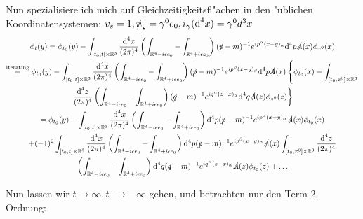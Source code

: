 \documentclass[a4paper,12pt]{article}
\newcommand{\equaltext}[1]{\ensuremath{\stackrel{\text{#1}}{=}}}
\begin{document}
Nun spezialisiere ich mich auf Gleichzeitigkeitsfl"achen in den "ublichen Koordinatensystemen: \(v_s=1,\slashed{n}_s=\gamma^0 e_0, i_\gamma(\text{d}^4 x)=\gamma^0 d^3x\)
\begin{multline}
\phi_t(y)=\phi_{t_0}(y)
- \int_{[t_0,t]\times \mathbb{R}^3} \frac{\text{d}^4x}{(2\pi)^4} \left( \int_{\mathbb{R}^4-i \epsilon e_0}-\int_{\mathbb{R}^4+i \epsilon e_0} \right) (\slashed{p}-m)^{-1} e^{ip^\alpha (x-y)_\alpha}  \text{d}^4p \slashed{A}(x)\phi_{x^0}(x)\\
\equaltext{iterating}\phi_{t_0}(y)- \int_{[t_0,t]\times \mathbb{R}^3} \frac{\text{d}^4x}{(2\pi)^4} \left( \int_{\mathbb{R}^4-i \epsilon e_0}-\int_{\mathbb{R}^4+i \epsilon e_0} \right) (\slashed{p}-m)^{-1} e^{ip^\beta(x-y)_\beta}  \text{d}^4p \slashed{A}(x)\left\{\phi_{t_0}(x)- \int_{[t_0,x^0]\times \mathbb{R}^3} \right.\\ 
\left. \frac{\text{d}^4z}{(2\pi)^4} \left( \int_{\mathbb{R}^4-i \epsilon e_0}-\int_{\mathbb{R}^4+i \epsilon e_0} \right) (\slashed{q}-m)^{-1} e^{iq^\alpha(z-x)_\alpha}  \text{d}^4q \slashed{A}(z)\phi_{z^0}(z)\right\}\\
=\phi_{t_0}(y)- \int_{[t_0,t]\times \mathbb{R}^3} \frac{\text{d}^4x}{(2\pi)^4} \left( \int_{\mathbb{R}^4-i \epsilon e_0}-\int_{\mathbb{R}^4+i \epsilon e_0} \right)\text{d}^4p (\slashed{p}-m)^{-1} e^{ip^\alpha(x-y)_\alpha}   \slashed{A}(x)\phi_{t_0}(x) \\ 
+(-1)^2 \int_{[t_0,t]\times \mathbb{R}^3} \frac{\text{d}^4x}{(2\pi)^4} \left( \int_{\mathbb{R}^4-i \epsilon e_0}-\int_{\mathbb{R}^4+i \epsilon e_0} \right)\text{d}^4p (\slashed{p}-m)^{-1} e^{ip^\beta(x-y)_\beta}   \slashed{A}(x) \int_{[t_0,x^0]\times \mathbb{R}^3}\frac{\text{d}^4z}{(2\pi)^4} \\ \left( \int_{\mathbb{R}^4-i \epsilon e_0}-\int_{\mathbb{R}^4+i \epsilon e_0} \right)\text{d}^4q (\slashed{q}-m)^{-1} e^{iq^\alpha(z-x)_\alpha}   \slashed{A}(z)\phi_{t_0}(z)+\dots\\
\end{multline}

Nun lassen wir \(t\rightarrow \infty, t_0\rightarrow -\infty\) gehen, und betrachten nur den Term 2. Ordnung:
\end{document}
